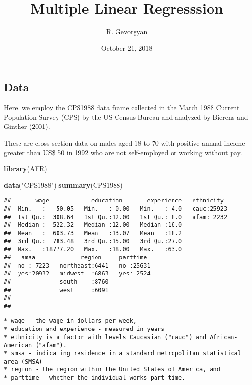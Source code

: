 \documentclass[]{article}
\title{Multiple Linear Regresssion}
\author{R. Gevorgyan}
\date{October 21, 2018}
\newenvironment{Shaded}{\begin{snugshade}}{\end{snugshade}}
\newcommand{\KeywordTok}[1]{\textcolor[rgb]{0.13,0.29,0.53}{\textbf{#1}}}
\newcommand{\StringTok}[1]{\textcolor[rgb]{0.31,0.60,0.02}{#1}}
\newcommand{\NormalTok}[1]{#1}
\begin{document}
\maketitle

\subsection{Data}\label{data}

Here, we employ the CPS1988 data frame collected in the March 1988
Current Population Survey (CPS) by the US Census Bureau and analyzed by
Bierens and Ginther (2001).

These are cross-section data on males aged 18 to 70 with positive annual
income greater than US\$ 50 in 1992 who are not self-employed or working
without pay.

\begin{Shaded}
\begin{Highlighting}[]
\KeywordTok{library}\NormalTok{(AER)}
\end{Highlighting}
\end{Shaded}

\begin{Shaded}
\begin{Highlighting}[]
\KeywordTok{data}\NormalTok{(}\StringTok{"CPS1988"}\NormalTok{)}
\KeywordTok{summary}\NormalTok{(CPS1988)}
\end{Highlighting}
\end{Shaded}

\begin{verbatim}
##       wage            education       experience   ethnicity   
##  Min.   :   50.05   Min.   : 0.00   Min.   :-4.0   cauc:25923  
##  1st Qu.:  308.64   1st Qu.:12.00   1st Qu.: 8.0   afam: 2232  
##  Median :  522.32   Median :12.00   Median :16.0               
##  Mean   :  603.73   Mean   :13.07   Mean   :18.2               
##  3rd Qu.:  783.48   3rd Qu.:15.00   3rd Qu.:27.0               
##  Max.   :18777.20   Max.   :18.00   Max.   :63.0               
##   smsa             region     parttime   
##  no : 7223   northeast:6441   no :25631  
##  yes:20932   midwest  :6863   yes: 2524  
##              south    :8760              
##              west     :6091              
##                                          
## 
\end{verbatim}

\begin{verbatim}
* wage - the wage in dollars per week, 
* education and experience - measured in years
* ethnicity is a factor with levels Caucasian ("cauc") and African-American ("afam"). 
* smsa - indicating residence in a standard metropolitan statistical area (SMSA) 
* region - the region within the United States of America, and
* parttime - whether the individual works part-time.
\end{verbatim}
\end{document}
